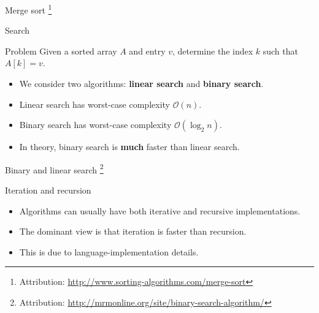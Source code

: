 \documentclass[]{beamer}
\renewcommand{\emph}{\textbf}
\newcommand{\Order}{\mathcal{O}}
\begin{document}
\begin{frame}[t]{Merge sort}
    \centering
    \footnote{Attribution: \url{http://www.sorting-algorithms.com/merge-sort}}
\end{frame}

\begin{frame}[t]{Search}
\begin{block}{Problem}
Given a sorted array $A$ and entry $v$, determine the index $k$ such that $A[k] = v$.
\end{block}
\begin{itemize}
	\item We consider two algorithms: \emph{linear search} and \emph{binary search}.
    \item Linear search has worst-case complexity $\Order(n)$.
    \item Binary search has worst-case complexity $\Order(\log_2 n)$.
    \item In theory, binary search is \emph{much} faster than linear search.
\end{itemize}
\end{frame}

\begin{frame}[t]{Binary and linear search}
    \centering
    \footnote{Attribution: \url{http://mrmonline.org/site/binary-search-algorithm/}}
\end{frame}

\begin{frame}[t]{Iteration and recursion}
\begin{itemize}
	\item Algorithms can usually have both iterative and recursive implementations.
    \item The dominant view is that iteration is faster than recursion.
    \item This is due to language-implementation details.
\end{itemize}
\end{frame}
\end{document}
